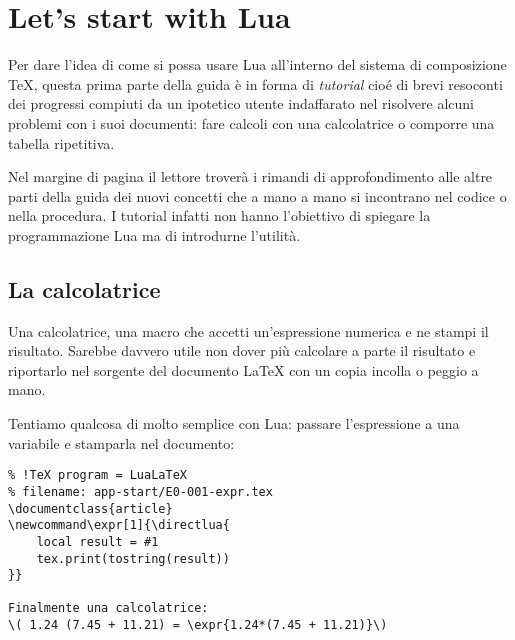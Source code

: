 


\chapter{Let's start with Lua}
\label{chGo}

Per dare l'idea di come si possa usare Lua all'interno del sistema di
composizione \TeX{}, questa prima parte della guida è in forma di
\emph{tutorial} cioé di brevi resoconti dei progressi compiuti da un ipotetico
utente \LuaLaTeX{} indaffarato nel risolvere alcuni problemi con i suoi
documenti: fare calcoli con una calcolatrice o comporre una tabella ripetitiva.

Nel margine di pagina il lettore troverà i rimandi di approfondimento alle altre
parti della guida dei nuovi concetti che a mano a mano si incontrano nel codice
o nella procedura. I tutorial infatti non hanno l'obiettivo di spiegare la
programmazione Lua ma di introdurne l'utilità.


\section{La calcolatrice}

Una calcolatrice, una macro  che accetti un'espressione numerica e
ne stampi il risultato. Sarebbe davvero utile non dover più calcolare a
parte il risultato e riportarlo nel sorgente del documento \LaTeX{} con un copia
incolla o peggio a mano.

%
%
%
Tentiamo qualcosa di molto semplice con Lua: passare l'espressione a una
variabile e stamparla nel documento:
\begin{Verbatim}
% !TeX program = LuaLaTeX
% filename: app-start/E0-001-expr.tex
\documentclass{article}
\newcommand\expr[1]{\directlua{
    local result = #1
    tex.print(tostring(result))
}}

Finalmente una calcolatrice:
\( 1.24 (7.45 + 11.21) = \expr{1.24*(7.45 + 11.21)}\)

\end{Verbatim}

